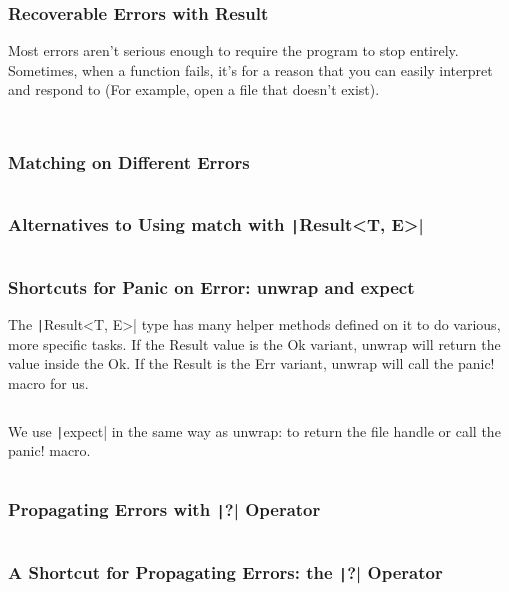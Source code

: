 \documentclass{beamer}
\begin{document}
\begin{frame}[fragile]
	\frametitle{Recoverable Errors with Result}
	Most errors aren’t serious enough to require the program to stop entirely. Sometimes, when a function fails, it’s for a reason that you can easily interpret and respond to (For example, open a file that doesn’t exist).
	
	\scriptsize
	
	\inputminted[fontsize=\scriptsize]{rust}{./code/result.rs}
	
	\inputminted[fontsize=\scriptsize]{rust}{./code/result2.rs}
\end{frame}


\begin{frame}[fragile]
	\frametitle{Matching on Different Errors}
	
	\inputminted[fontsize=\scriptsize]{rust}{./code/result3.rs}
\end{frame}


\begin{frame}[fragile]
	\frametitle{Alternatives to Using match with \texttt|Result<T, E>| }
	
	\inputminted[fontsize=\scriptsize]{rust}{./code/result4.rs}
\end{frame}

\begin{frame}[fragile]
	\frametitle{Shortcuts for Panic on Error: unwrap and expect }
	\scriptsize
	The \texttt|Result<T, E>| type has many helper methods defined on it to do various, more specific tasks. If the Result value is the Ok variant, unwrap will return the value inside the Ok. If the Result is the Err variant, unwrap will call the panic! macro for us.
	
	\inputminted[fontsize=\scriptsize]{rust}{./code/result5.rs}
	
	We use  \texttt|expect| in the same way as unwrap: to return the file handle or call the panic! macro.
	
	\inputminted[fontsize=\scriptsize]{rust}{./code/result6.rs}
\end{frame}



\begin{frame}[fragile]
	\frametitle{Propagating Errors with  \texttt|?| Operator}
	\inputminted{rust}{./code/result8.rs}
\end{frame}

\begin{frame}[fragile]
	\frametitle{A Shortcut for Propagating Errors: the \texttt|?| Operator}
	\inputminted{rust}{./code/result7.rs}
\end{frame}
\end{document}
